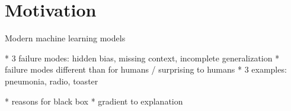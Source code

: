 \section{Motivation}
Modern machine learning models

* 3 failure modes: hidden bias, missing context, incomplete generalization
* failure modes different than for humans / surprising to humans
* 3 examples: pneumonia, radio, toaster



* reasons for black box
* gradient to explanation